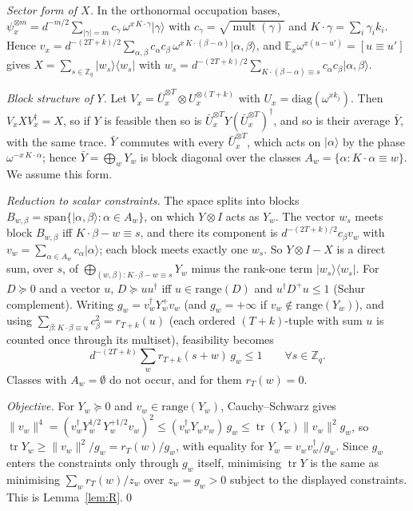 \documentclass[11pt]{article}
\newcommand{\Z}{\mathbb{Z}}
\newcommand{\E}{\mathbb{E}}
\newcommand{\tr}{\operatorname{tr}}
\newcommand{\mult}{\operatorname{mult}}
\newcommand{\ket}[1]{\lvert #1\rangle}
\newcommand{\bra}[1]{\langle #1\rvert}
\theoremstyle{definition}
\theoremstyle{remark}
\begin{document}
\emph{Sector form of $X$.} In the orthonormal occupation bases, $\psi_x^{\otimes m}=d^{-m/2}\sum_{|\gamma|=m}c_\gamma\,\omega^{x\,K\cdot\gamma}\ket\gamma$
with $c_\gamma=\sqrt{\mult(\gamma)}$ and $K\cdot\gamma=\sum_i\gamma_ik_i$. Hence $v_x=d^{-(2T+k)/2}\sum_{\alpha,\beta}c_\alpha c_\beta\,
\omega^{x\,K\cdot(\beta-\alpha)}\ket{\alpha,\beta}$, and $\E_x\omega^{x(u-u')}=[u\equiv u']$ gives
$X=\sum_{s\in\Z_q}\ket{w_s}\bra{w_s}$ with $w_s=d^{-(2T+k)/2}\sum_{K\cdot(\beta-\alpha)\equiv s}c_\alpha c_\beta\ket{\alpha,\beta}$.

\emph{Block structure of $Y$.} Let $V_x=\bar U_x^{\otimes T}\otimes U_x^{\otimes(T+k)}$ with $U_x=\mathrm{diag}(\omega^{xk_j})$. Then $V_xXV_x^\dagger=X$, so if $Y$
is feasible then so is $\bar U_x^{\otimes T}Y(\bar U_x^{\otimes T})^\dagger$, and so is their average $\bar Y$, with the same trace. $\bar Y$ commutes
with every $\bar U_x^{\otimes T}$, which acts on $\ket\alpha$ by the phase $\omega^{-x\,K\cdot\alpha}$; hence $\bar Y=\bigoplus_wY_w$ is block diagonal over the
classes $A_w=\{\alpha:K\cdot\alpha\equiv w\}$. We assume this form.

\emph{Reduction to scalar constraints.} The space splits into blocks $B_{w,\beta}=\mathrm{span}\{\ket{\alpha,\beta}:\alpha\in A_w\}$, on which
$Y\otimes I$ acts as $Y_w$. The vector $w_s$ meets block $B_{w,\beta}$ iff $K\cdot\beta-w\equiv s$, and there its component is
$d^{-(2T+k)/2}c_\beta v_w$ with $v_w=\sum_{\alpha\in A_w}c_\alpha\ket\alpha$; each block meets exactly one $w_s$. So $Y\otimes I-X$ is a direct sum, over
$s$, of $\bigoplus_{(w,\beta):K\cdot\beta-w\equiv s}Y_w$ minus the rank-one term $\ket{w_s}\bra{w_s}$. For $D\succeq0$ and a vector $u$,
$D\succeq uu^\dagger$ iff $u\in\mathrm{range}(D)$ and $u^\dagger D^+u\le1$ (Schur complement). Writing $g_w=v_w^\dagger Y_w^+v_w$ (and $g_w=+\infty$ if
$v_w\notin\mathrm{range}(Y_w)$), and using $\sum_{\beta:K\cdot\beta\equiv u}c_\beta^2=r_{T+k}(u)$ (each ordered $(T+k)$-tuple with sum $u$ is counted once
through its multiset), feasibility becomes
\[
d^{-(2T+k)}\sum_w r_{T+k}(s+w)\,g_w\le1\qquad\forall s\in\Z_q .
\]
Classes with $A_w=\emptyset$ do not occur, and for them $r_T(w)=0$.

\emph{Objective.} For $Y_w\succeq0$ and $v_w\in\mathrm{range}(Y_w)$, Cauchy--Schwarz gives
$\lVert v_w\rVert^4=(v_w^\dagger Y_w^{1/2}\,Y_w^{+1/2}v_w)^2\le(v_w^\dagger Y_wv_w)\,g_w\le\tr(Y_w)\lVert v_w\rVert^2g_w$, so
$\tr Y_w\ge\lVert v_w\rVert^2/g_w=r_T(w)/g_w$, with equality for $Y_w=v_wv_w^\dagger/g_w$. Since $g_w$ enters the constraints only through
$g_w$ itself, minimising $\tr Y$ is the same as minimising $\sum_wr_T(w)/z_w$ over $z_w=g_w>0$ subject to the displayed constraints. This is
Lemma~\ref{lem:R}.\qed
\end{document}
